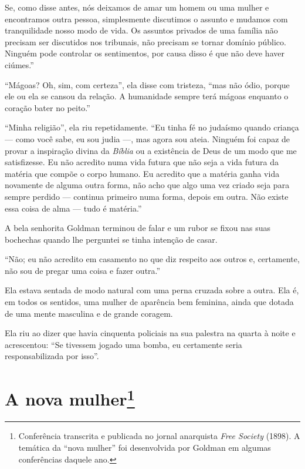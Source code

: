 Se, como disse antes, nós deixamos de amar um homem ou uma
mulher e encontramos outra pessoa, simplesmente discutimos o assunto e mudamos
com tranquilidade nosso modo de vida. Os assuntos privados de uma família
não precisam ser discutidos nos tribunais, não precisam se tornar
domínio público. Ninguém pode controlar os sentimentos, por causa disso
é que não deve haver ciúmes.''

``Mágoas? Oh, sim, com certeza'', ela disse com tristeza, ``mas não
ódio, porque ele ou ela se cansou da relação. A humanidade sempre terá
mágoas enquanto o coração bater no peito.''

``Minha religião'', ela riu repetidamente. ``Eu tinha fé no judaísmo
quando criança --- como você sabe, eu sou judia ---, mas agora sou ateia.
Ninguém foi capaz de provar a inspiração divina da \emph{Bíblia} ou a
existência de Deus de um modo que me satisfizesse. Eu não acredito numa
vida futura que não seja a vida futura da matéria que compõe o corpo
humano. Eu acredito que a matéria ganha vida novamente de alguma outra
forma, não acho que algo uma vez criado seja para sempre perdido --- continua primeiro numa forma, depois em outra. Não existe essa
coisa de alma --- tudo é matéria.''

A bela senhorita Goldman terminou de falar e um rubor se fixou nas suas
bochechas quando lhe perguntei se tinha intenção de casar.

``Não; eu não acredito em casamento no que diz respeito aos outros e,
certamente, não sou de pregar uma coisa e fazer outra.''

Ela estava sentada de modo natural com uma perna cruzada sobre a outra.
Ela é, em todos os sentidos, uma mulher de aparência bem feminina, ainda
que dotada de uma mente masculina e de grande coragem.

Ela riu ao dizer que havia cinquenta policiais na sua palestra na quarta
à noite e acrescentou: ``Se tivessem jogado uma bomba, eu certamente
seria responsabilizada por isso''.

\chapter{A nova mulher\footnote{Conferência transcrita e publicada no jornal
  anarquista \emph{Free Society} (1898). A temática da ``nova mulher'' foi
  desenvolvida por Goldman em algumas conferências daquele ano.}}

